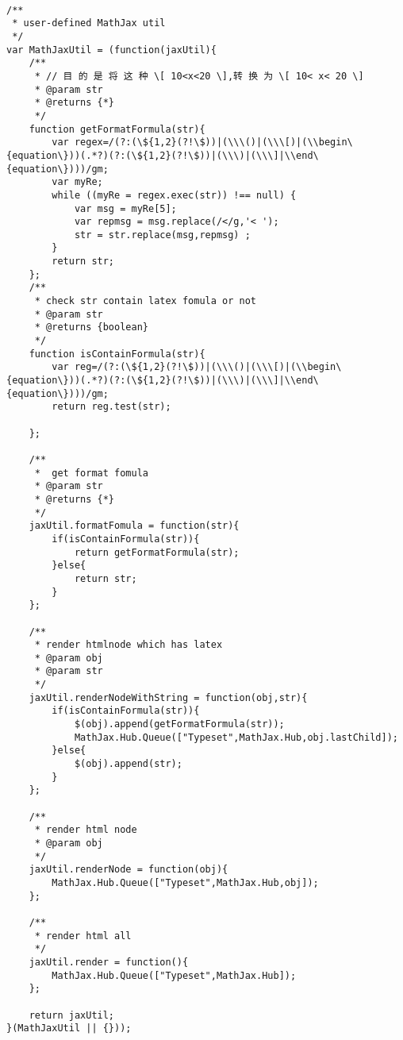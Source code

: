 \documentclass[UTF8]{ctexart}
\begin{document}
\begin{lstlisting}

/**
 * user-defined MathJax util
 */
var MathJaxUtil = (function(jaxUtil){
    /**
     * // 目 的 是 将 这 种 \[ 10<x<20 \],转 换 为 \[ 10< x< 20 \]
     * @param str
     * @returns {*}
     */
    function getFormatFormula(str){
        var regex=/(?:(\${1,2}(?!\$))|(\\\()|(\\\[)|(\\begin\{equation\}))(.*?)(?:(\${1,2}(?!\$))|(\\\)|(\\\]|\\end\{equation\})))/gm;
        var myRe;
        while ((myRe = regex.exec(str)) !== null) {
            var msg = myRe[5];
            var repmsg = msg.replace(/</g,'< ');
            str = str.replace(msg,repmsg) ;
        }
        return str;
    };
    /**
     * check str contain latex fomula or not
     * @param str
     * @returns {boolean}
     */
    function isContainFormula(str){
        var reg=/(?:(\${1,2}(?!\$))|(\\\()|(\\\[)|(\\begin\{equation\}))(.*?)(?:(\${1,2}(?!\$))|(\\\)|(\\\]|\\end\{equation\})))/gm;
        return reg.test(str);

    };

    /**
     *  get format fomula
     * @param str
     * @returns {*}
     */
    jaxUtil.formatFomula = function(str){
        if(isContainFormula(str)){
            return getFormatFormula(str);
        }else{
            return str;
        }
    };

    /**
     * render htmlnode which has latex
     * @param obj
     * @param str
     */
    jaxUtil.renderNodeWithString = function(obj,str){
        if(isContainFormula(str)){
            $(obj).append(getFormatFormula(str));
            MathJax.Hub.Queue(["Typeset",MathJax.Hub,obj.lastChild]);
        }else{
            $(obj).append(str);
        }
    };

    /**
     * render html node
     * @param obj
     */
    jaxUtil.renderNode = function(obj){
        MathJax.Hub.Queue(["Typeset",MathJax.Hub,obj]);
    };

    /**
     * render html all
     */
    jaxUtil.render = function(){
        MathJax.Hub.Queue(["Typeset",MathJax.Hub]);
    };

    return jaxUtil;
}(MathJaxUtil || {}));



\end{lstlisting}
\end{document}
